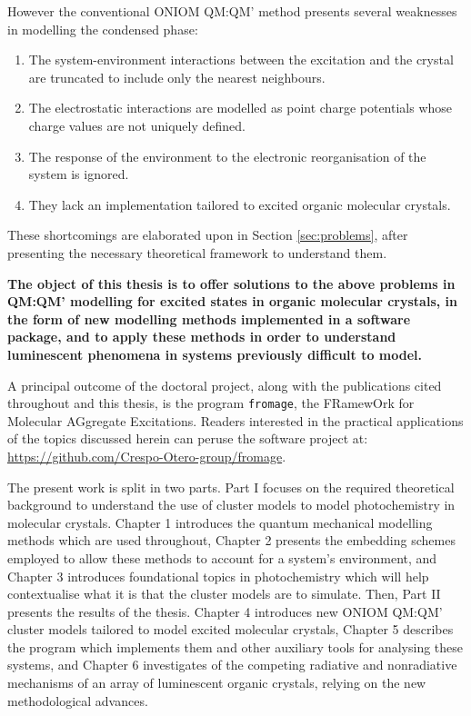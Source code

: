 However the conventional ONIOM QM:QM' method presents several weaknesses in modelling the condensed phase:
\begin{enumerate}
    \item The system-environment interactions between the excitation and the crystal are truncated to include only the nearest neighbours.
    \item The electrostatic interactions are modelled as point charge potentials whose charge values are not uniquely defined.
    \item The response of the environment to the electronic reorganisation of the system is ignored.
    \item They lack an implementation tailored to excited organic molecular crystals.
\end{enumerate}
These shortcomings are elaborated upon in Section \ref{sec:problems}, after presenting the necessary theoretical framework to understand them.

\textbf{The object of this thesis is to offer solutions to the above problems in QM:QM' modelling for excited states in organic molecular crystals, in the form of new modelling methods implemented in a software package, and to apply these methods in order to understand luminescent phenomena in systems previously difficult to model.}

A principal outcome of the doctoral project, along with the publications cited throughout and this thesis, is the program \texttt{fromage}, the FRamewOrk for Molecular AGgregate Excitations. Readers interested in the practical applications of the topics discussed herein can peruse the software project at: \href{https://github.com/Crespo-Otero-group/fromage}{https://github.com/Crespo-Otero-group/fromage}.

The present work is split in two parts. Part I focuses on the required theoretical background to understand the use of cluster models to model photochemistry in molecular crystals. Chapter 1 introduces the quantum mechanical modelling methods which are used throughout, Chapter 2 presents the embedding schemes employed to allow these methods to account for a system's environment, and Chapter 3 introduces foundational topics in photochemistry which will help contextualise what it is that the cluster models are to simulate. Then, Part II presents the results of the thesis. Chapter 4 introduces new ONIOM QM:QM' cluster models tailored to model excited molecular crystals, Chapter 5 describes the program which implements them and other auxiliary tools for analysing these systems, and Chapter 6 investigates of the competing radiative and nonradiative mechanisms of an array of luminescent organic crystals, relying on the new methodological advances.

